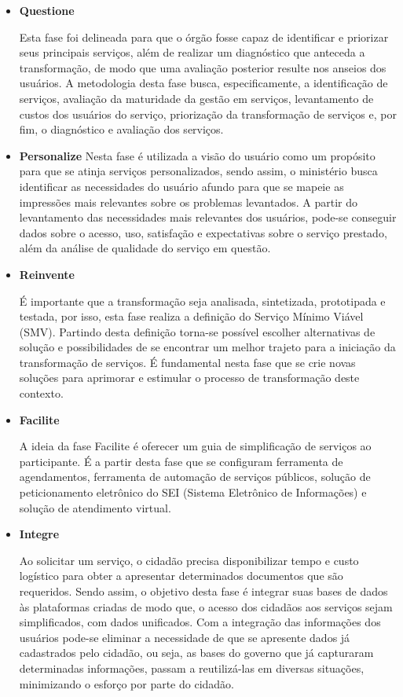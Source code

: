 \begin{itemize}
\item \textbf{Questione}

Esta fase foi delineada para que o órgão fosse capaz de identificar e priorizar seus principais serviços, além de realizar um diagnóstico que anteceda a transformação, de modo que uma avaliação posterior resulte nos anseios dos usuários. A metodologia desta fase busca, especificamente, a identificação de serviços, avaliação da maturidade da gestão em serviços, levantamento de custos dos usuários do serviço, priorização da transformação de serviços e, por fim, o diagnóstico e avaliação dos serviços.

\item \textbf{Personalize}
Nesta fase é utilizada a visão do usuário como um propósito para que se atinja serviços personalizados, sendo assim, o ministério busca identificar as necessidades do usuário afundo para que se mapeie as impressões mais relevantes sobre os problemas levantados. A partir do levantamento das necessidades mais relevantes dos usuários, pode-se conseguir dados sobre o acesso, uso, satisfação e expectativas sobre o serviço prestado, além da análise de qualidade do serviço em questão.


\item \textbf{Reinvente}


É importante que a transformação seja analisada, sintetizada, prototipada e testada, por isso, esta fase realiza a definição do Serviço Mínimo Viável (SMV). Partindo desta definição torna-se possível escolher alternativas de solução e possibilidades de se encontrar um melhor trajeto para a iniciação da transformação de serviços. É fundamental nesta fase que se crie novas soluções para aprimorar e estimular o processo de transformação deste contexto.


\item \textbf{Facilite}


A ideia da fase Facilite é oferecer um guia de simplificação de serviços ao participante. É a partir desta fase que se configuram ferramenta de agendamentos, ferramenta de automação de serviços públicos, solução de peticionamento eletrônico do SEI (Sistema Eletrônico de Informações) e solução de atendimento virtual.



\item \textbf{Integre}


Ao solicitar um serviço, o cidadão precisa disponibilizar tempo e custo logístico para obter a apresentar determinados documentos que são requeridos. Sendo assim, o objetivo desta fase é integrar suas bases de dados às plataformas criadas de modo que, o acesso dos cidadãos aos serviços sejam simplificados, com dados unificados. Com a integração das informações dos usuários pode-se eliminar a necessidade de que se apresente dados já cadastrados pelo cidadão, ou seja, as bases do governo que já capturaram determinadas informações, passam a reutilizá-las em diversas situações, minimizando o esforço por parte do cidadão.



\end{itemize}
